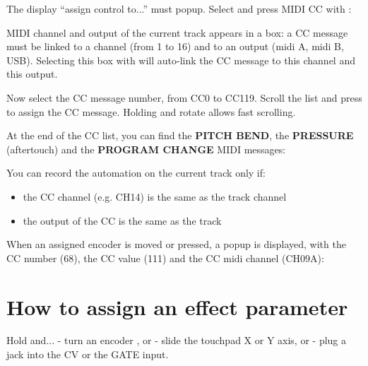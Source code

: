 The display ``assign control to...'' must popup. Select and press MIDI CC with \encodericon{}:


MIDI channel and output of the current track appears in a box: a CC message must be linked to a channel (from 1 to 16) and to an output (midi A, midi B, USB). Selecting this box with \encodericon{} will auto-link the CC message to this channel and this output.


Now select the CC message number, from CC0 to CC119. Scroll the list and press \encodericon{} to assign the CC message. Holding  and rotate \encodericon{} allows fast scrolling.


At the end of the CC list, you can find the \textbf{PITCH BEND}, the \textbf{PRESSURE} (aftertouch) and the \textbf{PROGRAM CHANGE} MIDI messages:


You can record the automation on the current track only if:
\begin{itemize}
\item the CC channel (e.g. CH14) is the same as the track channel
\item the output of the CC is the same as the track
\end{itemize}


When an assigned encoder is moved or pressed, a popup is displayed, with the CC number (68), the CC value (111) and the CC midi channel (CH09A):


\section{How to assign an effect parameter}

Hold  and...
- turn an encoder \encodersicon{}, or
- slide the touchpad \touchpadicon{} X or Y axis, or
- plug a jack into the CV or the GATE input.


